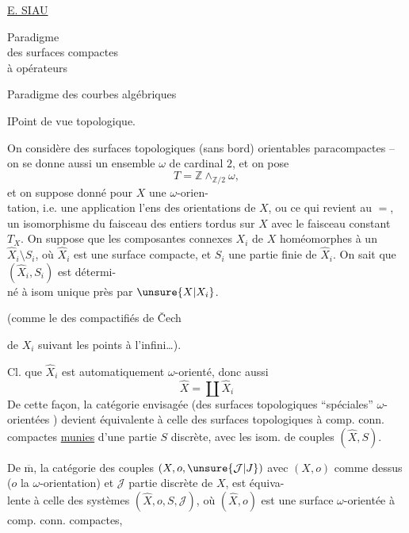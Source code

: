 
\uline{E. SIAU}

Paradigme \\
des surfaces compactes\\
à opérateurs

Paradigme des courbes algébriques

I\quad Point de vue topologique.

On considère des surfaces topologiques (sans bord) orientables paracompactes  -- on se donne aussi un ensemble $\omega$ de cardinal $2$, et on pose
\[
T=\mathbb Z\wedge_{\mathbb Z/2}\omega,
\]
et on suppose donné pour $X$ une $\omega$-orien-\\
tation, i.e. une application  l'ens des orientations de $X$, ou ce qui revient au $=$, un isomorphisme du faisceau des entiers tordus sur $X$ avec le faisceau constant $T_X$. On suppose que les composantes connexes $X_i$ de $X$  homéomorphes à un $\widehat X_i\setminus S_i$, où $\widehat X_i$ est une surface compacte, et $S_i$ une partie finie de $\widehat X_i$. On sait que $(\widehat X_i,S_i)$ est détermi-\\
né à isom unique près par $\unsure{X|X_i}$.

(comme le  des compactifiés de Čech

de $X_i$ suivant les points à l'infini\ldots).

Cl. que $\widehat X_i$ est automatiquement $\omega$-orienté, donc aussi
\[
\widehat X=\coprod\widehat X_i
\]
De cette façon, la catégorie envisagée (des surfaces topologiques ``spéciales'' $\omega$-orientées ) devient équivalente à celle des surfaces topologiques  à comp. conn. compactes \uline{munies} d'une partie  $S$ discrète, avec les isom. de couples $(\widehat X,S)$.

De $\overline{\mathrm m}$, la catégorie des couples  $(X,o,\unsure{\mathcal J|J})$ avec $(X,o)$ comme dessus ($o$ la $\omega$-orientation) et $\mathcal J$ partie discrète de $X$, est équiva-\\
lente à celle des systèmes $(\widehat X,o,S,\mathcal J)$, où $(\widehat X,o)$ est une surface $\omega$-orientée à comp. conn. compactes,


